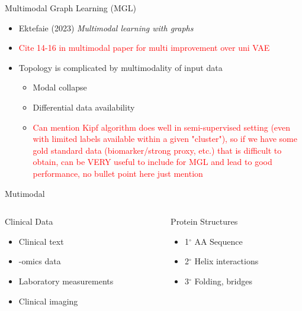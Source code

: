\documentclass{beamer}
\begin{document}
\begin{frame}{Multimodal Graph Learning (MGL)}
\begin{itemize}\setlength\itemsep{6mm}
    \item Ektefaie (2023) {\it Multimodal learning with graphs} \cite{ektefaie_multimodal_2023}
    \item \textcolor{red}{Cite 14-16 in multimodal paper for multi improvement over uni VAE} 
    \item Topology is complicated by multimodality of input data 
    \begin{itemize}
        \item Modal collapse \cite{javaloy_mitigating_2022}
        \item Differential data availability 
        \item \textcolor{red}{Can mention Kipf algorithm does well in semi-supervised setting (even with limited labels available within a given "cluster"), so if we have some gold standard data (biomarker/strong proxy, etc.) that is difficult to obtain, can be VERY useful to include for MGL and lead to good performance, no bullet point here just mention}
    \end{itemize}
\end{itemize}    

\end{frame}

\begin{frame}{Mutimodal}
    \begin{columns}[T]
        \begin{column}{0.5\textwidth}
            Clinical Data
            \begin{itemize}        
                \item Clinical text  
                \item -omics data 
                \item Laboratory measurements 
                \item Clinical imaging
            \end{itemize}
            \end{column}
        \begin{column}{0.5\textwidth}
            Protein Structures
            \begin{itemize}        
                \item 1$^\circ$ AA Sequence
                \item 2$^\circ$ Helix interactions
                \item 3$^\circ$ Folding, bridges 
            \end{itemize}
        \end{column}
    \end{columns}
\end{frame}
\end{document}
